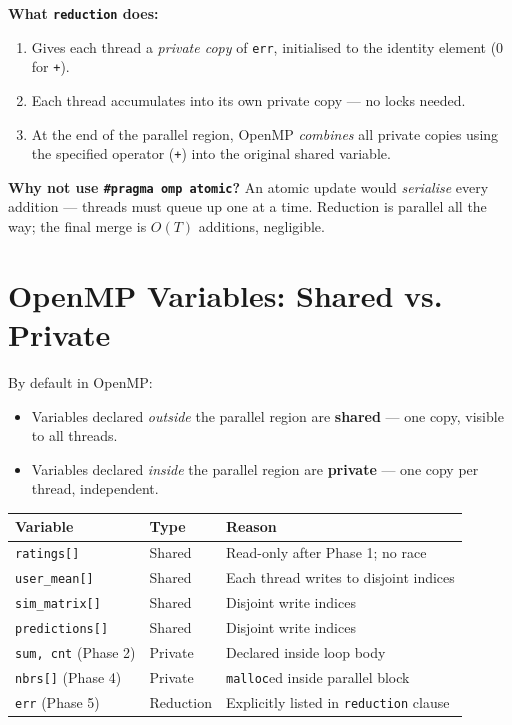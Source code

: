 \documentclass[12pt,a4paper]{article}
\begin{document}
\textbf{What \texttt{reduction} does:}
\begin{enumerate}
    \item Gives each thread a \emph{private copy} of \texttt{err}, initialised
          to the identity element (0 for \texttt{+}).
    \item Each thread accumulates into its own private copy — no locks needed.
    \item At the end of the parallel region, OpenMP \emph{combines} all private
          copies using the specified operator (\texttt{+}) into the original
          shared variable.
\end{enumerate}

\textbf{Why not use \texttt{\#pragma omp atomic}?}  An atomic update would
\emph{serialise} every addition — threads must queue up one at a time.
Reduction is parallel all the way; the final merge is $O(T)$ additions, negligible.

\section{OpenMP Variables: Shared vs. Private}

By default in OpenMP:
\begin{itemize}
    \item Variables declared \emph{outside} the parallel region are
          \textbf{shared} — one copy, visible to all threads.
    \item Variables declared \emph{inside} the parallel region are
          \textbf{private} — one copy per thread, independent.
\end{itemize}

\begin{center}
\begin{tabular}{lll}
\toprule
Variable & Type & Reason \\
\midrule
\texttt{ratings[]} & Shared & Read-only after Phase 1; no race \\
\texttt{user\_mean[]} & Shared & Each thread writes to disjoint indices \\
\texttt{sim\_matrix[]} & Shared & Disjoint write indices \\
\texttt{predictions[]} & Shared & Disjoint write indices \\
\texttt{sum, cnt} (Phase 2) & Private & Declared inside loop body \\
\texttt{nbrs[]} (Phase 4) & Private & \texttt{malloc}ed inside parallel block \\
\texttt{err} (Phase 5) & Reduction & Explicitly listed in \texttt{reduction} clause \\
\bottomrule
\end{tabular}
\end{center}
\end{document}
